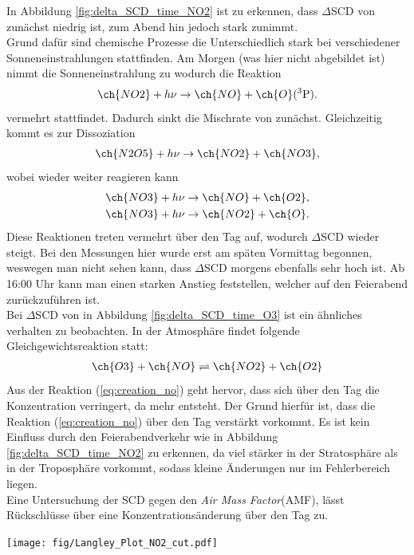\documentclass[12pt, a4paper, bibliography=totoc]{scrartcl}
\begin{document}
\begin{multicols}{2}
In Abbildung \ref{fig:delta_SCD_time_NO2} ist zu erkennen, dass $\Delta$SCD von  zunächst niedrig ist, zum Abend hin jedoch stark zunimmt.\\
Grund dafür sind chemische Prozesse die Unterschiedlich stark bei verschiedener Sonneneinstrahlungen stattfinden.
Am Morgen (was hier nicht abgebildet ist) nimmt die Sonneneinstrahlung zu wodurch die Reaktion
\begin{align}
    \ch{NO2} + h \nu \to \ch{NO} + \ch{O} (^3\text{P}). \label{eq:creation_no}
\end{align}
vermehrt stattfindet.
Dadurch sinkt die Mischrate von  zunächst.
Gleichzeitig kommt es zur Dissoziation 
\begin{align}
    \ch{N2O5} + h\nu \to \ch{NO2} + \ch{NO3},
\end{align}
wobei  wieder weiter reagieren kann
\begin{align}
    \ch{NO3} + h\nu \to \ch{NO} + \ch{O2}, \\
    \ch{NO3} + h\nu \to \ch{NO2} + \ch{O}.
\end{align}
Diese Reaktionen treten vermehrt über den Tag auf, wodurch $\Delta$SCD wieder steigt. 
Bei den Messungen hier wurde erst am späten Vormittag begonnen, weswegen man nicht sehen kann, dass $\Delta$SCD morgens ebenfalls sehr hoch ist.
Ab 16:00 Uhr kann man einen starken Anstieg feststellen, welcher auf den Feierabend zurückzuführen ist.\\
Bei $\Delta$SCD von  in Abbildung \ref{fig:delta_SCD_time_O3} ist ein ähnliches verhalten zu beobachten.
In der Atmosphäre findet folgende Gleichgewichtsreaktion statt:
\begin{align}
    \ch{O3} + \ch{NO} \rightleftharpoons \ch{NO2} + \ch{O2}
\end{align}
Aus der Reaktion (\ref{eq:creation_no}) geht hervor, dass sich über den Tag die  Konzentration verringert, da mehr  entsteht.
Der Grund hierfür ist, dass die Reaktion (\ref{eq:creation_no}) über den Tag verstärkt vorkommt.
Es ist kein Einfluss durch den Feierabendverkehr wie in Abbildung \ref{fig:delta_SCD_time_NO2} zu erkennen, da  viel stärker in der Stratosphäre als in der Troposphäre vorkommt, sodass kleine  Änderungen nur im Fehlerbereich liegen.
\\
Eine Untersuchung der SCD gegen den \textit{Air Mass Factor}(AMF), lässt Rückschlüsse über eine Konzentrationsänderung über den Tag zu.

\begin{center}
	\texttt{[image: fig/Langley\_Plot\_NO2\_cut.pdf]}
	\label{fig:langley_NO2}
\end{center}


\end{multicols}
\end{document}
